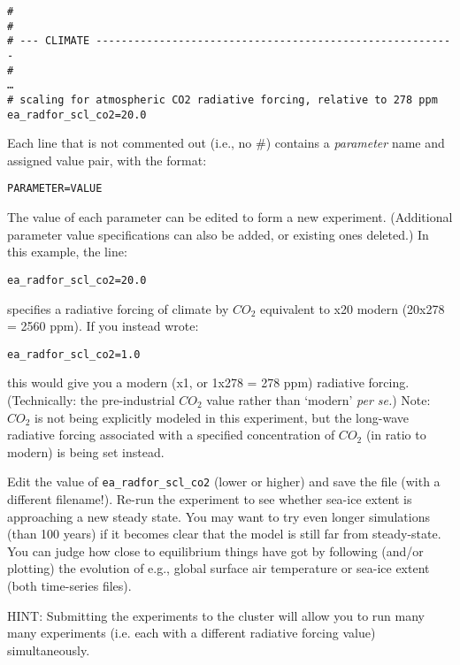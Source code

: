 \documentclass[11pt,fleqn]{book} %
\begin{document}
\vspace{-2mm}
\small\begin{verbatim}
#
#
# --- CLIMATE ---------------------------------------------------------
#
…
# scaling for atmospheric CO2 radiative forcing, relative to 278 ppm
ea_radfor_scl_co2=20.0
\end{verbatim}\normalsize
\vspace{-2mm}

Each line that is not commented out (i.e., no \#) contains a \textit{parameter} name and assigned value pair, with the format:
\vspace{-2mm}
\begin{verbatim}
PARAMETER=VALUE
\end{verbatim}
\vspace{-2mm}
The value of each parameter can be edited to form a new experiment. (Additional parameter value specifications can also be added, or existing ones deleted.) In this example, the line:
\vspace{-2mm}
\begin{verbatim}
ea_radfor_scl_co2=20.0
\end{verbatim}
\vspace{-2mm}
specifies a radiative forcing of climate by \(CO_{2}\) equivalent to x20 modern (20x278 = 2560 ppm). If you instead wrote:
\vspace{-2mm}
\begin{verbatim}
ea_radfor_scl_co2=1.0
\end{verbatim}
\vspace{-2mm}
this would give you a modern (x1, or 1x278 = 278 ppm) radiative forcing. (Technically: the pre-industrial \(CO_{2}\) value rather than ‘modern’ \textit{per se.})
Note: \(CO_{2}\) is not being explicitly modeled in this experiment, but the long-wave radiative forcing associated with a specified concentration of \(CO_{2}\) (in ratio to modern) is being set instead.

Edit the value of \texttt{ea\_radfor\_scl\_co2} (lower or higher) and save the file (with a different filename!). Re-run the experiment to see whether sea-ice extent is approaching a new steady state. You may want to try even longer simulations (than 100 years) if it becomes clear that the model is still far from steady-state. You can judge how close to equilibrium things have got by following (and/or plotting) the evolution of e.g., global surface air temperature or sea-ice extent (both time-series files).

HINT: Submitting the experiments to the cluster will allow you to run many many experiments (i.e. each with a different radiative forcing value) simultaneously.
\end{document}
